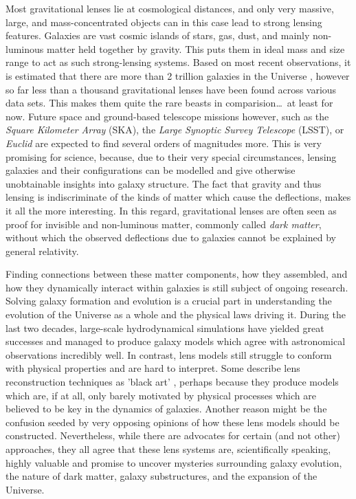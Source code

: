 Most gravitational lenses lie at cosmological distances, and only very massive,
large, and mass-concentrated objects can in this case lead to strong lensing
features.  Galaxies are vast cosmic islands of stars, gas, dust, and mainly
non-luminous matter held together by gravity.  This puts them in ideal mass and
size range to act as such strong-lensing systems.  Based on most recent
observations, it is estimated that there are more than 2 trillion galaxies
in the Universe , however so far less than a thousand
gravitational lenses have been found across various data sets.  This makes them
quite the rare beasts in comparision\dots\ at least for now.  Future space and
ground-based telescope missions however, such as the \textit{Square Kilometer
Array} (SKA), the \textit{Large Synoptic Survey Telescope} (LSST), or
\textit{Euclid} are expected to find several orders of magnitudes more.  This is
very promising for science, because, due to their very special circumstances,
lensing galaxies and their configurations can be modelled and give otherwise
unobtainable insights into galaxy structure.  The fact that gravity and thus
lensing is indiscriminate of the kinds of matter which cause the deflections,
makes it all the more interesting.  In this regard, gravitational lenses are
often seen as proof for invisible and non-luminous matter, commonly called \textit{dark
matter}, without which the observed deflections due to galaxies cannot be
explained by general relativity.

Finding connections between these matter components, how they assembled, and how
they dynamically interact within galaxies is still subject of ongoing research.
Solving galaxy formation and evolution is a crucial part in understanding the
evolution of the Universe as a whole and the physical laws driving it.  During
the last two decades, large-scale hydrodynamical simulations have yielded great
successes and managed to produce galaxy models which agree with astronomical
observations incredibly well.  In contrast, lens models still struggle to
conform with physical properties and are hard to interpret.  Some describe lens
reconstruction techniques as 'black art' , perhaps because
they produce models which are, if at all, only barely motivated by physical
processes which are believed to be key in the dynamics of galaxies. Another
reason might be the confusion seeded by very opposing opinions
of how these lens models should be constructed.  Nevertheless, while there are
advocates for certain (and not other) approaches, they all agree that these lens
systems are, scientifically speaking, highly valuable and promise to uncover
mysteries surrounding galaxy evolution, the nature of dark matter, galaxy
substructures, and the expansion of the Universe.

